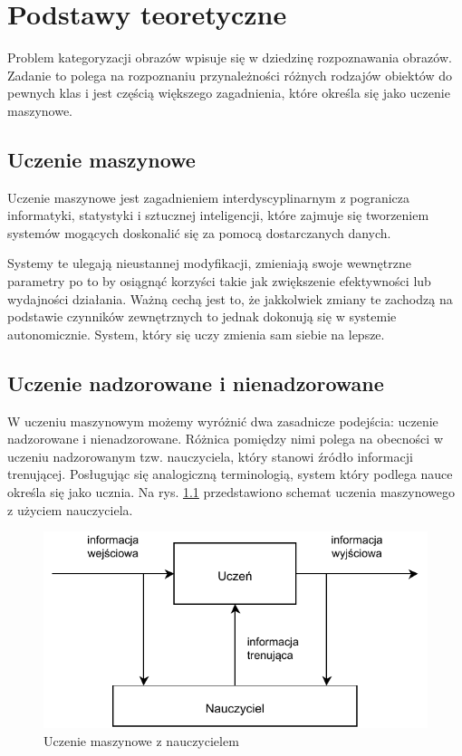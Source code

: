\chapter{Podstawy teoretyczne}

Problem kategoryzacji obrazów wpisuje się w dziedzinę rozpoznawania obrazów. Zadanie to polega na rozpoznaniu przynależności różnych rodzajów obiektów do pewnych klas\cite{Tad91} i jest częścią większego zagadnienia, które określa się jako uczenie maszynowe.

\section{Uczenie maszynowe}

Uczenie maszynowe jest zagadnieniem interdyscyplinarnym z pogranicza informatyki, statystyki i sztucznej inteligencji, które zajmuje się tworzeniem systemów mogących doskonalić się za pomocą dostarczanych danych.

Systemy te ulegają nieustannej modyfikacji, zmieniają swoje wewnętrzne parametry po to by osiągnąć korzyści takie jak zwiększenie efektywności lub wydajności działania. Ważną cechą jest to, że jakkolwiek zmiany te zachodzą na podstawie czynników zewnętrznych to jednak dokonują się w systemie autonomicznie. System, który się uczy zmienia sam siebie na lepsze.\cite{CICHOSZ00}

\section{Uczenie nadzorowane i nienadzorowane}

W uczeniu maszynowym możemy wyróżnić dwa zasadnicze podejścia: uczenie nadzorowane i nienadzorowane. Różnica pomiędzy nimi polega na obecności w uczeniu nadzorowanym tzw. nauczyciela, który stanowi źródło informacji trenującej. Posługując się analogiczną terminologią, system który podlega nauce określa się jako ucznia. Na rys. \ref{fig:supervised-learning} przedstawiono schemat uczenia maszynowego z użyciem nauczyciela.

\begin{figure}[h]
	\centering
	\includegraphics{graphics/01_podstawy_teoretyczne/supervised-learning.pdf}
	\caption{Uczenie maszynowe z nauczycielem \cite{CICHOSZ00}}
	\label{fig:supervised-learning}
\end{figure}

